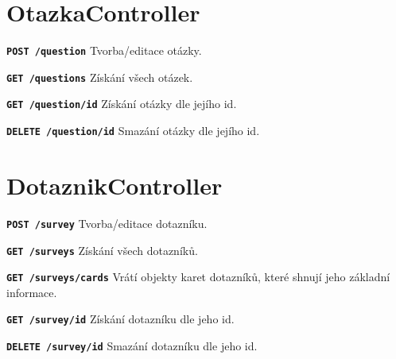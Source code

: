 \section{OtazkaController}
\begin{DESCRIPTION}
\item \texttt{\textbf{POST /question}} Tvorba/editace otázky.
\item \texttt{\textbf{GET /questions}} Získání všech otázek.
\item \texttt{\textbf{GET /question/{id}}} Získání otázky dle jejího id.
\item \texttt{\textbf{DELETE /question/{id}}} Smazání otázky dle jejího id.
\end{DESCRIPTION}

\section{DotaznikController}
\begin{DESCRIPTION}
\item \texttt{\textbf{POST /survey}} Tvorba/editace dotazníku.
\item \texttt{\textbf{GET /surveys}} Získání všech dotazníků.
\item \texttt{\textbf{GET /surveys/cards}} Vrátí objekty karet dotazníků, které shnují jeho základní informace.
\item \texttt{\textbf{GET /survey/{id}}} Získání dotazníku dle jeho id.
\item \texttt{\textbf{DELETE /survey/{id}}} Smazání dotazníku dle jeho id.
\end{DESCRIPTION}

